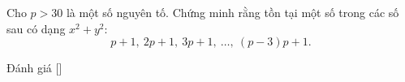 \ifshowproblem
\begin{problem}\label{problem:IRN-2015-MO3-NP5}
	Cho $p > 30$ là một số nguyên tố. Chứng minh rằng tồn tại một số trong các số sau có dạng $x^2 + y^2$:
	\[
		p+1,\ 2p+1,\ 3p+1,\ \ldots,\ (p-3)p+1.
	\]
\end{problem}
\fi

\ifshowinfo
Đánh giá [\textbf{}]\footnotemark
{}
\fi